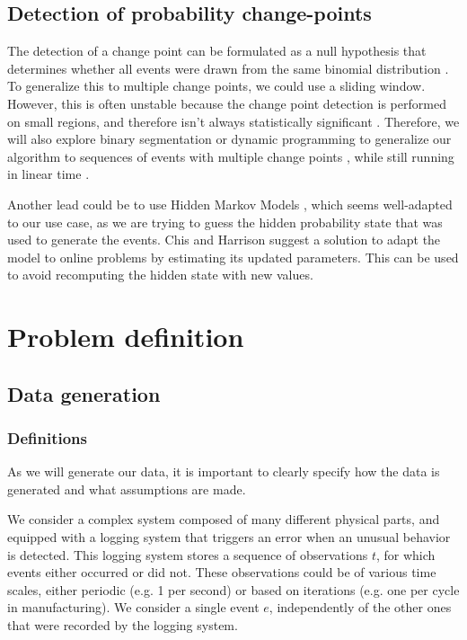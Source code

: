 \documentclass{kththesis}
\begin{document}
\section{Detection of probability change-points}

The detection of a change point can be formulated as a null hypothesis that determines whether all events were drawn from the same binomial distribution \parencite{wasserman2004}.
To generalize this to multiple change points, we could use a sliding window. However, this is often unstable because the change point detection is performed on small regions, and therefore isn't always statistically significant \parencite{esteller2001, harchaoui2010}.
Therefore, we will also explore binary segmentation or dynamic programming to generalize our algorithm to sequences of events with multiple change points \parencite{jackson2005}, while still running in linear time \parencite{killick2012}.


Another lead could be to use Hidden Markov Models \parencite{baum1966}, which seems well-adapted to our use case, as we are trying to guess the hidden probability state that was used to generate the events. Chis and Harrison \parencite{chis2015} suggest a solution to adapt the model to online problems by estimating its updated parameters. This can be used to avoid recomputing the hidden state with new values.


\chapter{Problem definition}

\section{Data generation}

\subsection{Definitions}

As we will generate our data, it is important to clearly specify how the data is generated and what assumptions are made.

We consider a complex system composed of many different physical parts, and equipped with a logging system that triggers an error when an unusual behavior is detected. 
This logging system stores a sequence of observations $t$, for which events either occurred or did not.
These observations could be of various time scales, either periodic (e.g. 1 per second) or based on iterations (e.g. one per cycle in manufacturing). 
We consider a single event $e$, independently of the other ones that were recorded by the logging system.
\end{document}
